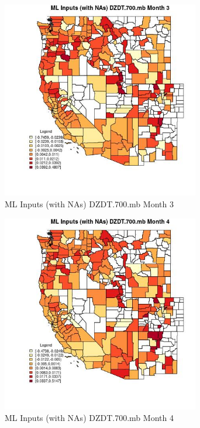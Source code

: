\begin{figure} 
\centering  
\includegraphics[width=0.77\textwidth]{Code_Outputs/Report_ML_input_PM25_Step4_part_e_de_duplicated_aves_compiled_2019-05-21wNAs_CountyDZDT700mbmedianMonth3.jpg} 
\caption{\label{fig:Report_ML_input_PM25_Step4_part_e_de_duplicated_aves_compiled_2019-05-21wNAsCountyDZDT700mbmedianMonth3}ML Inputs (with NAs) DZDT.700.mb Month 3} 
\end{figure} 
 

\begin{figure} 
\centering  
\includegraphics[width=0.77\textwidth]{Code_Outputs/Report_ML_input_PM25_Step4_part_e_de_duplicated_aves_compiled_2019-05-21wNAs_CountyDZDT700mbmedianMonth4.jpg} 
\caption{\label{fig:Report_ML_input_PM25_Step4_part_e_de_duplicated_aves_compiled_2019-05-21wNAsCountyDZDT700mbmedianMonth4}ML Inputs (with NAs) DZDT.700.mb Month 4} 
\end{figure} 
 

